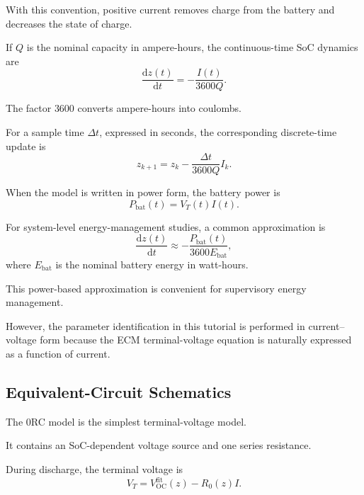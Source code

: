 \documentclass[a4paper,12pt]{article}
\begin{document}
With this convention, positive current removes charge from the battery and decreases the state of charge.

If \(Q\) is the nominal capacity in ampere-hours, the continuous-time SoC dynamics are
\begin{equation}
\frac{\mathrm{d}z(t)}{\mathrm{d}t}
=
-\frac{I(t)}{3600Q}.
\label{eq:soc_dynamics_continuous}
\end{equation}

The factor \(3600\) converts ampere-hours into coulombs.

For a sample time \(\Delta t\), expressed in seconds, the corresponding discrete-time update is
\begin{equation}
z_{k+1}
=
z_k
-
\frac{\Delta t}{3600Q}I_k.
\label{eq:soc_dynamics_discrete}
\end{equation}

When the model is written in power form, the battery power is
\begin{equation}
P_{\mathrm{bat}}(t)
=
V_T(t)I(t).
\label{eq:battery_power_definition}
\end{equation}

For system-level energy-management studies, a common approximation is
\begin{equation}
\frac{\mathrm{d}z(t)}{\mathrm{d}t}
\approx
-\frac{P_{\mathrm{bat}}(t)}{3600E_{\mathrm{bat}}},
\label{eq:soc_power_approx}
\end{equation}
where \(E_{\mathrm{bat}}\) is the nominal battery energy in watt-hours.

This power-based approximation is convenient for supervisory energy management.

However, the parameter identification in this tutorial is performed in current--voltage form because the ECM terminal-voltage equation is naturally expressed as a function of current.

\subsection{Equivalent-Circuit Schematics}

The 0RC model is the simplest terminal-voltage model.

It contains an SoC-dependent voltage source and one series resistance.

During discharge, the terminal voltage is
\begin{equation}
V_T
=
V_{\mathrm{OC}}^{\mathrm{fit}}(z)
-
R_0(z)I.
\label{eq:terminal_voltage_0rc}
\end{equation}
\end{document}
